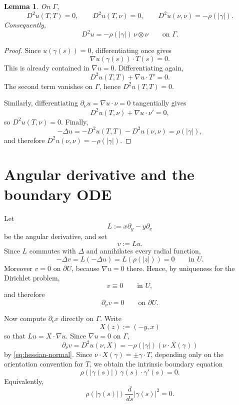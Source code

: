 \documentclass[11pt]{article}
\newtheorem{lemma}[theorem]{Lemma}
\newcommand{\dd}{\,d}
\newcommand{\1}{\mathbf 1}
\begin{document}
\begin{lemma}\label{lem:hessian}
On \(\Gamma\),
\[
  D^2u(T,T)=0,\qquad D^2u(T,\nu)=0,\qquad D^2u(\nu,\nu)=-\rho(|\gamma|).
\]
Consequently,
\begin{equation}\label{eq:hessian-normal}
  D^2u=-\rho(|\gamma|)\,\nu\otimes\nu
  \qquad\text{on }\Gamma .
\end{equation}
\end{lemma}

\begin{proof}
Since \(u(\gamma(s))=0\), differentiating once gives
\[
  \nabla u(\gamma(s))\cdot T(s)=0.
\]
This is already contained in \(\nabla u=0\).  Differentiating again,
\[
  D^2u(T,T)+\nabla u\cdot T'=0.
\]
The second term vanishes on \(\Gamma\), hence \(D^2u(T,T)=0\).

Similarly, differentiating \(\partial_\nu u=\nabla u\cdot\nu=0\) tangentially gives
\[
  D^2u(T,\nu)+\nabla u\cdot\nu'=0,
\]
so \(D^2u(T,\nu)=0\).  Finally,
\[
  -\Delta u
  =
  -D^2u(T,T)-D^2u(\nu,\nu)
  =
  \rho(|\gamma|),
\]
and therefore \(D^2u(\nu,\nu)=-\rho(|\gamma|)\).
\end{proof}

\section{Angular derivative and the boundary ODE}

Let
\[
  L:=x\partial_y-y\partial_x
\]
be the angular derivative, and set
\[
  v:=Lu.
\]
Since \(L\) commutes with \(\Delta\) and annihilates every radial function,
\[
  -\Delta v=L(-\Delta u)=L(\rho(|z|))=0
  \qquad\text{in }U .
\]
Moreover \(v=0\) on \(\partial U\), because \(\nabla u=0\) there.  Hence, by
uniqueness for the Dirichlet problem,
\[
  v\equiv0\qquad\text{in }U,
\]
and therefore
\[
  \partial_\nu v=0\qquad\text{on }\partial U .
\]

Now compute \(\partial_\nu v\) directly on \(\Gamma\).  Write
\[
  X(z):=(-y,x)
\]
so that \(Lu=X\cdot\nabla u\).  Since \(\nabla u=0\) on \(\Gamma\),
\[
  \partial_\nu v
  =
  D^2u(\nu,X)
  =
  -\rho(|\gamma|)(\nu\cdot X(\gamma))
\]
by \eqref{eq:hessian-normal}.  Since \(\nu\cdot X(\gamma)=\pm\gamma\cdot T\),
depending only on the orientation convention for \(T\), we obtain the intrinsic
boundary equation
\begin{equation}\label{eq:boundary-ode}
  \rho(|\gamma(s)|)\,\gamma(s)\cdot\gamma'(s)=0 .
\end{equation}
Equivalently,
\begin{equation}\label{eq:radius-ode}
  \rho(|\gamma(s)|)\frac{\dd}{\dd s}|\gamma(s)|^2=0 .
\end{equation}
\end{document}
